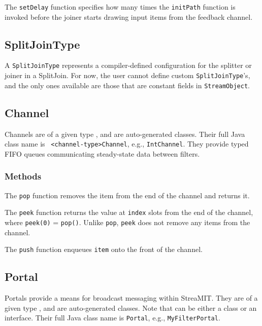   The {\tt setDelay} function specifies how many times the {\tt initPath} function is invoked before the joiner starts drawing input items from the feedback channel.

\subsection{SplitJoinType}

A {\tt SplitJoinType} represents a compiler-defined configuration for
the splitter or joiner in a SplitJoin.  For now, the user cannot
define custom {\tt SplitJoinType}'s, and the only ones available are
those that are constant fields in {\tt StreamObject}.

\subsection{Channel}

Channels are of a given type {\tt <channel-type>}, and are
auto-generated classes.  Their full Java class name is {\tt
<channel-type>Channel}, e.g., {\tt IntChannel}.  They provide typed
FIFO queues communicating steady-state data between filters.

\subsubsection{Methods}

  The {\tt pop} function removes the item from the end of the channel and returns it.

  The {\tt peek} function returns the value at {\tt index} slots from the end of the channel, where {\tt peek(0)} = {\tt pop()}.  Unlike {\tt pop}, {\tt peek} does not remove any items from the channel.

  The {\tt push} function enqueues {\tt item} onto the front of the channel.

\subsection{Portal}

Portals provide a means for broadcast messaging within StreaMIT.  They
are of a given type {\tt <portal-type>}, and are auto-generated
classes.  Note that {\tt <portal-type>} can be either a class or an
interface.  Their full Java class name is {\tt <portal-type>Portal},
e.g., {\tt MyFilterPortal}.

